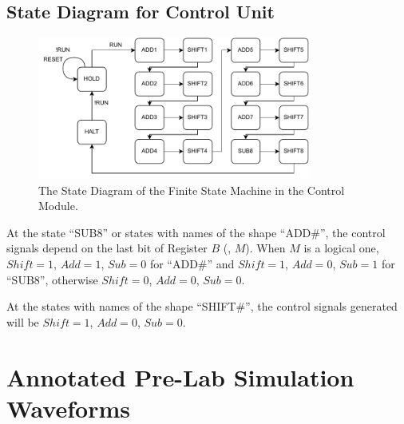 \documentclass{article}
\begin{document}
\subsection{State Diagram for Control Unit}
\begin{figure}[h]
    \centering
    \includegraphics[width=0.8\textwidth]{fsm_chart.pdf}
    \caption{The State Diagram of the Finite State Machine in the Control Module. }
    \label{fig:state}
\end{figure}

At the state ``SUB8'' or states with names of the shape ``ADD\#'', the control signals depend on the last bit of Register $B$ (\ie, $M$). When $M$ is a logical one, $Shift = 1$, $Add = 1$, $Sub = 0$ for ``ADD\#'' and $Shift = 1$, $Add = 0$, $Sub = 1$ for ``SUB8'', otherwise $Shift = 0$, $Add = 0$, $Sub = 0$.

At the states with names of the shape ``SHIFT\#'', the control signals generated will be $Shift = 1$, $Add = 0$, $Sub = 0$.


\section{Annotated Pre-Lab Simulation Waveforms}
\end{document}
